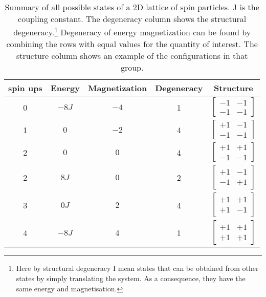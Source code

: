 \documentclass[english,notitlepage,reprint,nofootinbib]{revtex4-1}  %
\begin{document}
\begin{table}[H]
    \centering
    \begin{tabular}{|c|c|c|c|c|}
        \hline
        spin ups & Energy & Magnetization & Degeneracy & Structure\\
        \hline
        0 & $-8J$ & $-4$ & 1 & $\begin{bmatrix}
            -1 & -1 \\ -1 & -1
        \end{bmatrix}$ \\
        \hline
        1 & $0$ & $-2$ & 4 & $\begin{bmatrix}
            +1 & -1 \\ -1 & -1
        \end{bmatrix}$ \\
        \hline
        2 & $0$ & $0$ & 4 & $\begin{bmatrix}
            +1 & +1 \\ -1 & -1
        \end{bmatrix}$ \\
        \hline
        2 & $8J$ & $0$ & 2 & $\begin{bmatrix}
            +1 & -1 \\ -1 & +1
        \end{bmatrix}$ \\
        \hline
        3 & $0J$ & $2$ & 4 & $\begin{bmatrix}
            +1 & +1 \\ +1 & -1
        \end{bmatrix}$ \\
        \hline
        4 & $-8J$ & $4$ & 1 & $\begin{bmatrix}
            +1 & +1 \\ +1 & +1
        \end{bmatrix}$ \\
        \hline
    \end{tabular}
    \caption{Summary of all possible states of a 2D lattice of spin particles. J is the coupling constant. The degeneracy column shows the structural degeneracy.\footnote{Here by structural degeneracy I mean states that can be obtained from other states by simply translating the system. As a consequence, they have the same energy and magnetisation.} Degeneracy of energy magnetization can be found by combining the rows with equal values for the quantity of interest. The structure column shows an example of the configurations in that group.}
    \label{tab:2x2}
\end{table}
\end{document}
